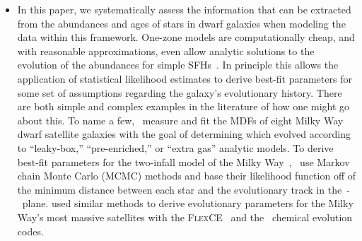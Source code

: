 \documentclass[ms.tex]{subfiles}
\begin{document}
\begin{itemize}


	\item In this paper, we systematically assess the information that can be
	extracted from the abundances and ages of stars in dwarf galaxies when
	modeling the data within this framework.
	One-zone models are computationally cheap, and with reasonable
	approximations, even allow analytic solutions to the evolution of the
	abundances for simple SFHs~\citep*[e.g.][]{Weinberg2017}.
	In principle this allows the application of statistical likelihood
	estimates to derive best-fit parameters for some set of assumptions
	regarding the galaxy's evolutionary history.
	There are both simple and complex examples in the literature of how one
	might go about this.
	To name a few,~\citet{Kirby2011} measure and fit the MDFs of eight Milky
	Way dwarf satellite galaxies with the goal of determining which evolved
	according to ``leaky-box,'' ``pre-enriched,'' or ``extra gas'' analytic
	models.
	To derive best-fit parameters for the two-infall model of the Milky
	Way~\citep[e.g.][]{Chiappini1997},~\citet{Spitoni2020, Spitoni2021} use
	Markov chain Monte Carlo (MCMC) methods and base their likelihood function
	off of the minimum distance between each star and the evolutionary track in
	the~\afe-\feh~plane.
	\citet{Hasselquist2021} used similar methods to derive evolutionary
	parameters for the Milky Way's most massive satellites with the
	\textsc{FlexCE}~\citep{Andrews2017} and the~\citet{Lian2018, Lian2020}
	chemical evolution codes.


\end{itemize}
\end{document}
